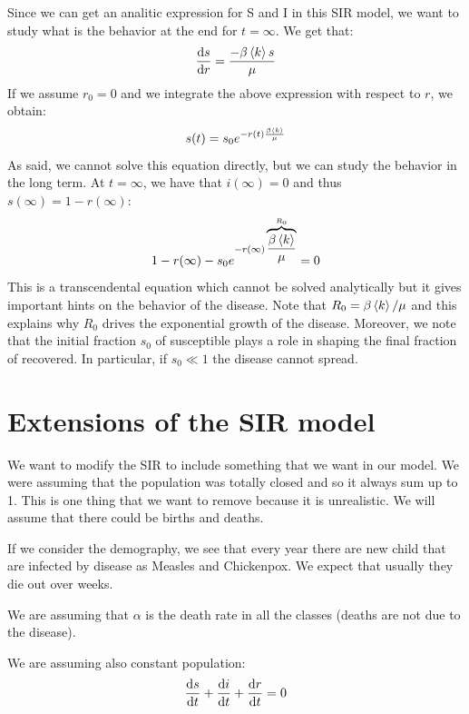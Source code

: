 \documentclass[../main/main.tex]{subfiles}
\begin{document}
Since we can get an analitic expression for S and I in this SIR model, we want to study what is the behavior at the end for \( t = \infty  \). We get that:
\begin{equation*}
  \dv{s}{r} = \frac{- \beta  \expval{k}  s}{\mu }
\end{equation*}
If we assume \( r_0 = 0  \) and we integrate the above expression with respect to \( r \), we obtain:
\begin{equation*}
  s(t) = s_0 e^{-r(t) \frac{\beta \expval{k} }{\mu }}
\end{equation*}
As said, we cannot solve this equation directly, but we can study the behavior in the long term. At \( t=\infty  \), we have that \( i (\infty ) = 0 \) and thus \( s(\infty ) = 1 - r(\infty ) \):
\begin{equation*}
  1 - r(\infty ) - s_0 e^{-r(\infty ) \overbrace{\frac{\beta \expval{k} }{\mu }}^{R_0}} = 0
\end{equation*}
This is a transcendental equation which cannot be solved analytically but it gives important hints on the behavior of the disease.
Note that \( R_0 = \beta \expval{k} / \mu   \) and this explains why \( R_0 \) drives the exponential growth of the disease. Moreover, we note that the initial fraction \( s_0 \) of susceptible plays a role in shaping the final fraction of recovered.
In particular, if \( s_0 \ll 1 \) the disease cannot spread.




\section{Extensions of the SIR model}
We want to modify the SIR to include something that we want in our model. We were assuming that the population was totally closed and so it always sum up to 1. This is one thing that we want to remove because it is unrealistic. We will assume that there could be births and deaths.

If we consider the demography, we see that every year there are new child that are infected by disease as Measles and Chickenpox. We expect that usually they die out over weeks.

We are assuming that \( \alpha  \) is the death rate in all the classes (deaths are not due to the disease).

We are assuming also constant population:
\begin{equation*}
  \dv{s}{t} + \dv{i}{t} + \dv{r}{t} = 0
\end{equation*}
\end{document}
